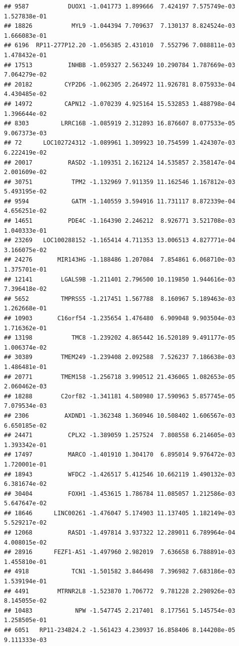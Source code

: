 \documentclass[
]{article}
\begin{document}
\begin{verbatim}
## 9587           DUOX1 -1.041773 1.899666  7.424197 7.575749e-03 1.527838e-01
## 18826           MYL9 -1.044394 7.709637  7.130137 8.824524e-03 1.666083e-01
## 6196  RP11-277P12.20 -1.056385 2.431010  7.552796 7.088811e-03 1.478432e-01
## 17513          INHBB -1.059327 2.563249 10.290784 1.787669e-03 7.064279e-02
## 20182         CYP2D6 -1.062305 2.264972 11.926781 8.075933e-04 4.430485e-02
## 14972         CAPN12 -1.070239 4.925164 15.532853 1.488798e-04 1.396644e-02
## 8303         LRRC16B -1.085919 2.312893 16.876607 8.077533e-05 9.067373e-03
## 72      LOC102724312 -1.089961 1.309923 10.754599 1.424307e-03 6.222419e-02
## 20017          RASD2 -1.109351 2.162124 14.535857 2.358147e-04 2.001609e-02
## 30751           TPM2 -1.132969 7.911359 11.162546 1.167812e-03 5.493195e-02
## 9594            GATM -1.140559 3.594916 11.731117 8.872339e-04 4.656251e-02
## 14651          PDE4C -1.164390 2.246212  8.926771 3.521708e-03 1.040333e-01
## 23269   LOC100288152 -1.165414 4.711353 13.006513 4.827771e-04 3.166075e-02
## 24276       MIR143HG -1.188486 1.207084  7.854861 6.068710e-03 1.375701e-01
## 12141        LGALS9B -1.211401 2.796500 10.119850 1.944616e-03 7.396418e-02
## 5652         TMPRSS5 -1.217451 1.567788  8.160967 5.189463e-03 1.262668e-01
## 10903       C16orf54 -1.235654 1.476480  6.909048 9.903504e-03 1.716362e-01
## 13198           TMC8 -1.239202 4.865442 16.520189 9.491177e-05 1.006374e-02
## 30389        TMEM249 -1.239408 2.092588  7.526237 7.186638e-03 1.486481e-01
## 20771        TMEM158 -1.256718 3.990512 21.436065 1.082653e-05 2.060462e-03
## 18288        C2orf82 -1.341181 4.580980 17.590963 5.857745e-05 7.079534e-03
## 2306          AXDND1 -1.362348 1.360946 10.508402 1.606567e-03 6.650185e-02
## 24471          CPLX2 -1.389059 1.257524  7.808558 6.214605e-03 1.393342e-01
## 17497          MARCO -1.401910 1.304170  6.895014 9.976472e-03 1.720001e-01
## 18943          WFDC2 -1.426517 5.412546 10.662119 1.490132e-03 6.381674e-02
## 30404          FOXH1 -1.453615 1.786784 11.085057 1.212586e-03 5.647647e-02
## 18646      LINC00261 -1.476047 5.174903 11.137405 1.182149e-03 5.529217e-02
## 12068          RASD1 -1.497814 3.937322 12.289011 6.789964e-04 4.008015e-02
## 28916      FEZF1-AS1 -1.497960 2.982019  7.636658 6.788891e-03 1.455810e-01
## 4918            TCN1 -1.501582 3.846498  7.396982 7.683186e-03 1.539194e-01
## 4491        MTRNR2L8 -1.523870 1.706772  9.781228 2.298926e-03 8.145055e-02
## 10483            NPW -1.547745 2.217401  8.177561 5.145754e-03 1.258505e-01
## 6051   RP11-234B24.2 -1.561423 4.230937 16.858406 8.144208e-05 9.111333e-03

\end{verbatim}
\end{document}

